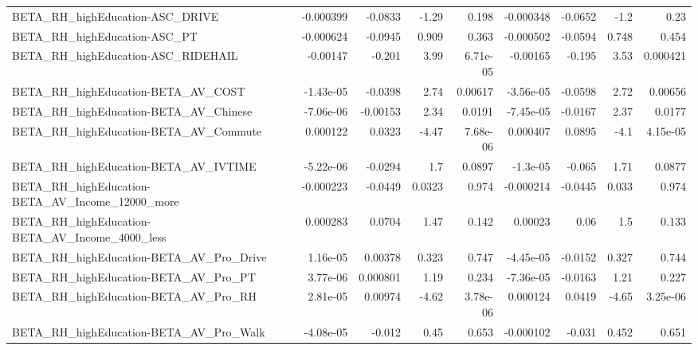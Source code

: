 \begin{tabular}{lrrrrrrrr}
BETA\_RH\_highEducation-ASC\_DRIVE                    &   -0.000399 &      -0.0833 &     -1.29 &    0.198 &  -0.000348 &     -0.0652 &         -1.2 &          0.23 \\
BETA\_RH\_highEducation-ASC\_PT                       &   -0.000624 &      -0.0945 &     0.909 &    0.363 &  -0.000502 &     -0.0594 &        0.748 &         0.454 \\
BETA\_RH\_highEducation-ASC\_RIDEHAIL                 &    -0.00147 &       -0.201 &      3.99 & 6.71e-05 &   -0.00165 &      -0.195 &         3.53 &      0.000421 \\
BETA\_RH\_highEducation-BETA\_AV\_COST                 &   -1.43e-05 &      -0.0398 &      2.74 &  0.00617 &  -3.56e-05 &     -0.0598 &         2.72 &       0.00656 \\
BETA\_RH\_highEducation-BETA\_AV\_Chinese              &   -7.06e-06 &     -0.00153 &      2.34 &   0.0191 &  -7.45e-05 &     -0.0167 &         2.37 &        0.0177 \\
BETA\_RH\_highEducation-BETA\_AV\_Commute              &    0.000122 &       0.0323 &     -4.47 & 7.68e-06 &   0.000407 &      0.0895 &         -4.1 &      4.15e-05 \\
BETA\_RH\_highEducation-BETA\_AV\_IVTIME               &   -5.22e-06 &      -0.0294 &       1.7 &   0.0897 &   -1.3e-05 &      -0.065 &         1.71 &        0.0877 \\
BETA\_RH\_highEducation-BETA\_AV\_Income\_12000\_more    &   -0.000223 &      -0.0449 &    0.0323 &    0.974 &  -0.000214 &     -0.0445 &        0.033 &         0.974 \\
BETA\_RH\_highEducation-BETA\_AV\_Income\_4000\_less     &    0.000283 &       0.0704 &      1.47 &    0.142 &    0.00023 &        0.06 &          1.5 &         0.133 \\
BETA\_RH\_highEducation-BETA\_AV\_Pro\_Drive            &    1.16e-05 &      0.00378 &     0.323 &    0.747 &  -4.45e-05 &     -0.0152 &        0.327 &         0.744 \\
BETA\_RH\_highEducation-BETA\_AV\_Pro\_PT               &    3.77e-06 &     0.000801 &      1.19 &    0.234 &  -7.36e-05 &     -0.0163 &         1.21 &         0.227 \\
BETA\_RH\_highEducation-BETA\_AV\_Pro\_RH               &    2.81e-05 &      0.00974 &     -4.62 & 3.78e-06 &   0.000124 &      0.0419 &        -4.65 &      3.25e-06 \\
BETA\_RH\_highEducation-BETA\_AV\_Pro\_Walk             &   -4.08e-05 &       -0.012 &      0.45 &    0.653 &  -0.000102 &      -0.031 &        0.452 &         0.651 \\

\end{tabular}
